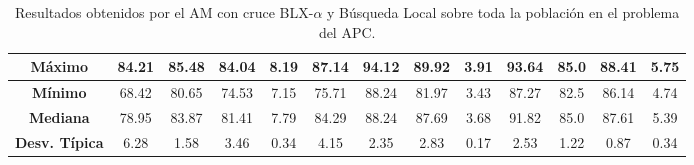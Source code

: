 \documentclass[11pt,a4paper]{article}
\begin{document}
\begin{table}[H]
{\begin{tabular}{c|c|c|c|c|c|c|c|c|c|c|c|c|}
\multicolumn{1}{|c|}{\textbf{Máximo}}       & 84.21             & 85.48                   & 84.04         & 8.19       & 87.14             & 94.12          & 89.92         & 3.91       & 93.64             & 85.0           & 88.41         & 5.75       \\ \hline
\multicolumn{1}{|c|}{\textbf{Mínimo}}       & 68.42             & 80.65                   & 74.53         & 7.15       & 75.71             & 88.24          & 81.97         & 3.43       & 87.27             & 82.5           & 86.14         & 4.74       \\ \hline
\multicolumn{1}{|c|}{\textbf{Mediana}}      & 78.95             & 83.87                   & 81.41         & 7.79       & 84.29             & 88.24          & 87.69         & 3.68       & 91.82             & 85.0           & 87.61         & 5.39       \\ \hline
\multicolumn{1}{|c|}{\textbf{Desv. Típica}} & 6.28              & 1.58                    & 3.46          & 0.34       & 4.15              & 2.35           & 2.83          & 0.17       & 2.53              & 1.22           & 0.87          & 0.34       \\ \hline
\end{tabular}
}%
\caption{Resultados obtenidos por el AM con cruce BLX-$\alpha$ y Búsqueda Local sobre toda la población en el problema del
APC.}
\end{table}
\end{document}
